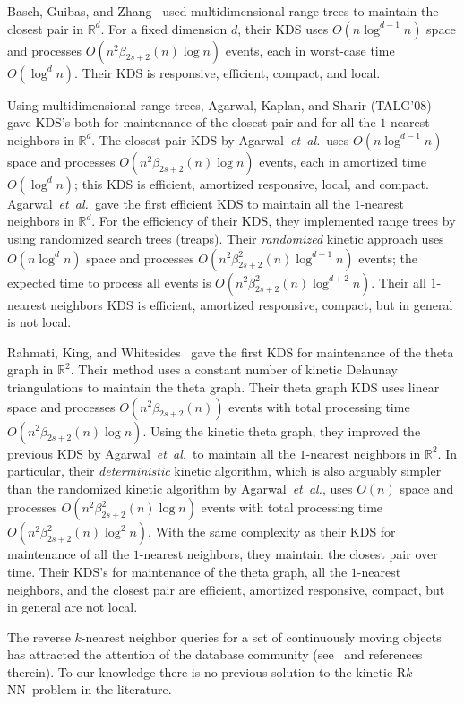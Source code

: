 \documentclass[preprint,12pt]{elsarticle}
\def\rknn{\mbox{R$k$NN}}
\newcommand{\etal}{\emph{et~al.}}
\begin{document}
Basch, Guibas, and Zhang~\cite{Basch:1997:PPM:262839.262998} used multidimensional range trees to maintain the closest pair in $\mathbb{R}^d$. For a fixed dimension $d$, their KDS uses $O(n\log^{d-1}n)$ space and processes $O(n^2\beta_{2s+2}(n)\log n)$ events, each in worst-case time $O(\log^d n)$. Their KDS is responsive, efficient, compact, and local.

Using multidimensional range trees, Agarwal, Kaplan, and Sharir (TALG'08)~\cite{Agarwal:2008:KDD:1435375.1435379} gave KDS's both for maintenance of the closest pair and for all the $1$-nearest neighbors in $\mathbb{R}^d$. The closest pair KDS by Agarwal~\etal~uses $O(n\log^{d-1} n)$ space and processes $O(n^2\beta_{2s+2}(n)\log n)$ events, each in amortized time $O(\log^d n)$; this KDS is efficient, amortized responsive, local, and compact. Agarwal~\etal~gave the first efficient KDS to maintain all the $1$-nearest neighbors in $\mathbb{R}^d$. For the efficiency of their KDS, they implemented range trees by using randomized search trees (treaps). Their \textit{randomized} kinetic approach uses $O(n\log^d n)$ space and processes $O(n^2\beta_{2s+2}^2(n)\log^{d+1} n)$ events; the expected time to process all events is $O(n^2\beta_{2s+2}^2(n)\log^{d+2} n)$. Their all $1$-nearest neighbors KDS is efficient, amortized responsive, compact, but in general is not local.

Rahmati, King, and Whitesides~\cite{Rahmati2014} gave the first KDS for maintenance of the theta graph in $\mathbb{R}^2$. Their method uses a constant number of kinetic Delaunay triangulations to maintain the theta graph. Their theta graph KDS uses linear space and processes $O(n^2\beta_{2s+2}(n))$ events with total processing time $O(n^2\beta_{2s+2}(n)\log n)$. Using the kinetic theta graph, they improved the previous KDS by Agarwal~\etal~to maintain all the $1$-nearest neighbors in $\mathbb{R}^2$. In particular, their \textit{deterministic} kinetic algorithm, which is also arguably simpler than the randomized kinetic algorithm by Agarwal~\etal, uses $O(n)$ space and processes $O(n^2\beta_{2s+2}^2(n)\log n)$ events with total processing time $O(n^2\beta_{2s+2}^2(n)\log^2 n)$. With the same complexity as their KDS for maintenance of all the $1$-nearest neighbors, they maintain the closest pair over time. Their KDS's for maintenance of the theta graph, all the $1$-nearest neighbors, and the closest pair are efficient, amortized responsive, compact, but in general are not local.

The reverse $k$-nearest neighbor queries for a set of continuously moving objects has attracted the attention of the database community (see~\cite{Cheema:2012:CRK:2124885.2124903} and references therein). To our knowledge there is no previous solution to the kinetic \rknn~problem in the literature.
\end{document}
